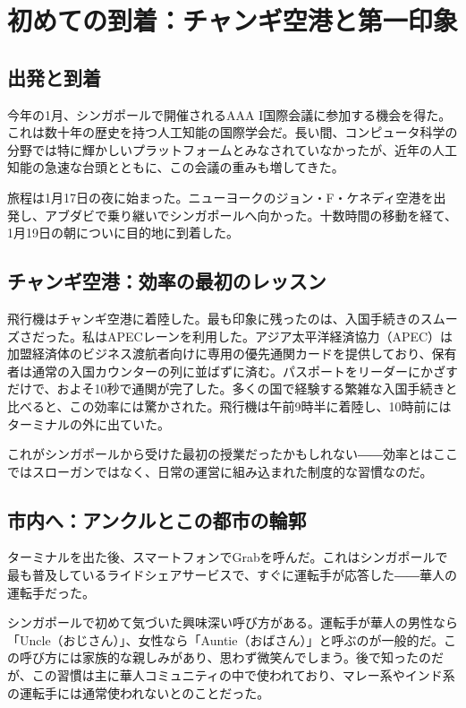 \chapter{初めての到着：チャンギ空港と第一印象}

\section{出発と到着}

今年の1月、シンガポールで開催されるAAA I国際会議に参加する機会を得た。これは数十年の歴史を持つ人工知能の国際学会だ。長い間、コンピュータ科学の分野では特に輝かしいプラットフォームとみなされていなかったが、近年の人工知能の急速な台頭とともに、この会議の重みも増してきた。

旅程は1月17日の夜に始まった。ニューヨークのジョン・F・ケネディ空港を出発し、アブダビで乗り継いでシンガポールへ向かった。十数時間の移動を経て、1月19日の朝についに目的地に到着した。

\section{チャンギ空港：効率の最初のレッスン}

飛行機はチャンギ空港に着陸した。最も印象に残ったのは、入国手続きのスムーズさだった。私はAPECレーンを利用した。アジア太平洋経済協力（APEC）は加盟経済体のビジネス渡航者向けに専用の優先通関カードを提供しており、保有者は通常の入国カウンターの列に並ばずに済む。パスポートをリーダーにかざすだけで、およそ10秒で通関が完了した。多くの国で経験する繁雑な入国手続きと比べると、この効率には驚かされた。飛行機は午前9時半に着陸し、10時前にはターミナルの外に出ていた。

これがシンガポールから受けた最初の授業だったかもしれない――効率とはここではスローガンではなく、日常の運営に組み込まれた制度的な習慣なのだ。

\section{市内へ：アンクルとこの都市の輪郭}

ターミナルを出た後、スマートフォンでGrabを呼んだ。これはシンガポールで最も普及しているライドシェアサービスで、すぐに運転手が応答した――華人の運転手だった。

シンガポールで初めて気づいた興味深い呼び方がある。運転手が華人の男性なら「Uncle（おじさん）」、女性なら「Auntie（おばさん）」と呼ぶのが一般的だ。この呼び方には家族的な親しみがあり、思わず微笑んでしまう。後で知ったのだが、この習慣は主に華人コミュニティの中で使われており、マレー系やインド系の運転手には通常使われないとのことだった。

